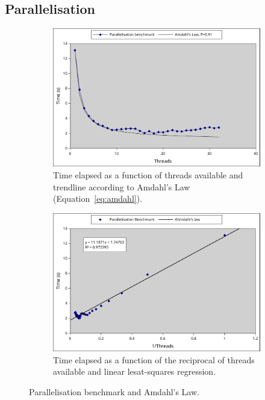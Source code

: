 \subsection{Parallelisation}
\label{ssub:parallelisation}

\begin{figure}
   \centering
   \begin{subfigure}[b]{0.4\textwidth}
   \centering
   \includegraphics[width=\linewidth]{figures/parallel1.pdf}
   \caption{Time elapsed as a function of threads available and trendline according to Amdahl's Law (Equation~\ref{eq:amdahl}).}
   \label{fig:parallel1}
   \end{subfigure}\quad\begin{subfigure}[b]{0.4\textwidth}
   \centering
   \includegraphics[width=\linewidth]{figures/parallel2.pdf}
       \caption{Time elapsed as a function of the reciprocal of threads available and linear lesat-squares regression.}
   \label{fig:parallel2}
   \end{subfigure}
   \caption{Parallelisation benchmark and Amdahl's Law.}
\end{figure}

